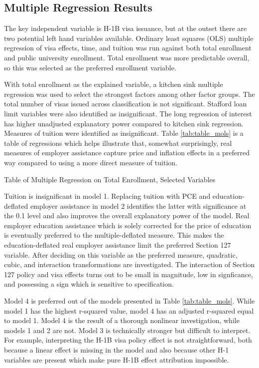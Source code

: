 \documentclass[review]{elsarticle}
\begin{document}
\subsection{Multiple Regression Results}
The key independent variable is H-1B visa issuance, but at the outset there are two potential left hand variables available.
Ordinary least squares (OLS) multiple regression of visa effects, time, and tuition was run against both total enrollment and public university enrollment.
Total enrollment was more predictable overall, so this was selected as the preferred enrollment variable.

With total enrollment as the explained variable,
a kitchen sink multiple regression was used to select the strongest factors among other factor groups.
The total number of visas issued across classification is not significant.
Stafford loan limit variables were also identified as insignificant.
The long regression of interest has higher unadjusted explanatory power compared to kitchen sink regression.
Measures of tuition were identified as insignificant.
Table \ref{tab:table_mols} is a table of regressions which helps illustrate that, somewhat surprisingly,
real measures of employer assistance capture price and inflation effects in a preferred way
compared to using a more direct measure of tuition.

\begin{table}
    \caption{Table of Multiple Regression on Total Enrollment, Selected Variables}
    \resizebox{\columnwidth}{!}{
        
    }
    \label{tab:table_mols}
\end{table}

Tuition is insignificant in model 1.
Replacing tuition with PCE and education-deflated employer assistance in model 2 identifies the latter
with significance at the 0.1 level and also improves the overall explanatory power of the model.
Real employer education assistance which is solely corrected for the price of education
is eventually preferred to the multiple-deflated measure.
This makes the education-deflated real employer assistance limit the preferred Section 127 variable.
After deciding on this variable as the preferred measure,
quadratic, cubic, and interaction transformations are investigated.
The interaction of Section 127 policy and visa effects turns out to be small in magnitude,
low in signficance,
and possessing a sign which is sensitive to specification.

Model 4 is preferred out of the models presented in Table \ref{tab:table_mols}.
While model 1 has the highest r-squared value,
model 4 has an adjusted r-squared equal to model 1.
Model 4 is the result of a thorough nonlinear investigation,
while models 1 and 2 are not.
Model 3 is technically stronger but difficult to interpret.
For example, interpreting the H-1B visa policy effect is not
straightforward, both because a linear effect is missing in the model
and also because other H-1 variables are present which make pure H-1B
effect attribution impossible.
\end{document}
